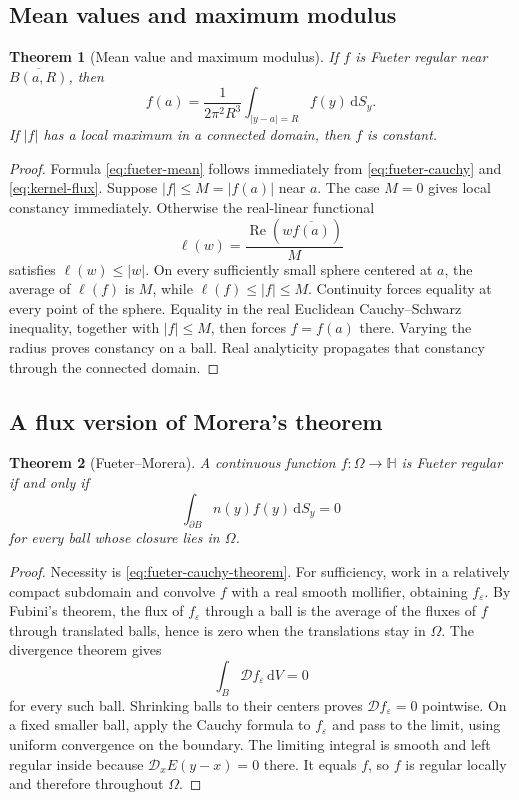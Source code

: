 \documentclass[11pt,a4paper]{article}
\numberwithin{equation}{section}
\newtheorem{theorem}{Theorem}[section]
\theoremstyle{definition}
\theoremstyle{remark}
\newcommand{\HH}{\mathbb H}
\newcommand{\Rea}{\operatorname{Re}}
\newcommand{\cD}{\mathcal D}
\newcommand{\dd}{\,\mathrm d}
\begin{document}
\subsection{Mean values and maximum modulus}
\begin{theorem}[Mean value and maximum modulus]\label{thm:fueter-max}
If $f$ is Fueter regular near $\overline{B(a,R)}$, then
\begin{equation}\label{eq:fueter-mean}
 f(a)=\frac{1}{2\pi^2R^3}\int_{|y-a|=R}f(y)\dd S_y.
\end{equation}
If $|f|$ has a local maximum in a connected domain, then $f$ is constant.
\end{theorem}
\begin{proof}
Formula \eqref{eq:fueter-mean} follows immediately from
\eqref{eq:fueter-cauchy} and \eqref{eq:kernel-flux}. Suppose $|f|\le M=|f(a)|$
near $a$. The case $M=0$ gives local constancy immediately. Otherwise the
real-linear functional
\[
 \ell(w)=\frac{\Rea(w\overline{f(a)})}{M}
\]
satisfies $\ell(w)\le |w|$. On every sufficiently small sphere centered at
$a$, the average of $\ell(f)$ is $M$, while $\ell(f)\le |f|\le M$.
Continuity forces equality at every point of the sphere. Equality in the
real Euclidean Cauchy--Schwarz inequality, together with $|f|\le M$, then
forces $f=f(a)$ there. Varying the radius proves constancy on a ball.
Real analyticity propagates that constancy through the connected domain.
\end{proof}

\subsection{A flux version of Morera's theorem}
\begin{theorem}[Fueter--Morera]\label{thm:fueter-morera}
A continuous function $f:\Omega\to\HH$ is Fueter regular if and only if
\begin{equation}\label{eq:fueter-morera}
 \int_{\partial B}n(y)f(y)\dd S_y=0
\end{equation}
for every ball whose closure lies in $\Omega$.
\end{theorem}
\begin{proof}
Necessity is \eqref{eq:fueter-cauchy-theorem}. For sufficiency, work in a
relatively compact subdomain and convolve $f$ with a real smooth mollifier,
obtaining $f_\varepsilon$. By Fubini's theorem, the flux of
$f_\varepsilon$ through a ball is the average of the fluxes of $f$ through
translated balls, hence is zero when the translations stay in $\Omega$.
The divergence theorem gives
\[
 \int_B\cD f_\varepsilon\dd V=0
\]
for every such ball. Shrinking balls to their centers proves
$\cD f_\varepsilon=0$ pointwise. On a fixed smaller ball, apply the Cauchy
formula to $f_\varepsilon$ and pass to the limit, using uniform convergence
on the boundary. The limiting integral is smooth and left regular inside
because $\cD_x E(y-x)=0$ there. It equals $f$, so $f$ is regular locally and
therefore throughout $\Omega$.
\end{proof}
\end{document}
